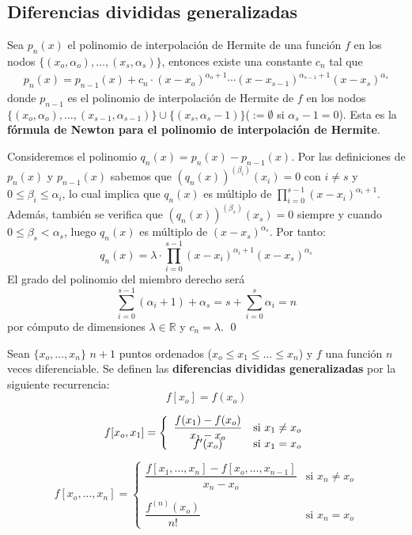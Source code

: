       \subsection{Diferencias divididas generalizadas}
      \begin{prop}
      Sea $p_n(x)$ el polinomio de interpolación de Hermite de una función $f$ en los nodos $\{(x_o,\alpha_o),\ldots,(x_s,\alpha_s)\}$, entonces existe una constante $c_n$ tal que
      \begin{align}
      p_n(x)=p_{n-1}(x)+c_n\cdot (x-x_o)^{\alpha_o+1}\cdots (x-x_{s-1})^{\alpha_{s-1}+1}(x-x_s)^{\alpha_s}
     \label{hermite:newton} \end{align}
      donde $p_{n-1}$ es el polinomio de interpolación de Hermite de $f$ en los nodos $\{(x_o,\alpha_o),\ldots,(x_{s-1},\alpha_{s-1})\}\cup \{(x_s,\alpha_s-1)\}$($:=\emptyset$ si $\alpha_s-1=0$). Esta es la \textbf{fórmula de Newton para el polinomio de interpolación de Hermite}.
      \end{prop}
      \begin{dem}
      Consideremos el polinomio $q_n(x)=p_n(x)-p_{n-1}(x)$. Por las definiciones de $p_n(x)$ y $p_{n-1}(x)$ sabemos que $(q_n(x))^{(\beta_i)}(x_i)=0$ con $i\neq s$ y $0\leq \beta_i\leq\alpha_i$, lo cual implica que $q_n(x)$ es múltiplo de $\prod_{i=0}^{s-1}(x-x_i)^{\alpha_i+1}$. Además, también se verifica que $(q_n(x))^{(\beta_s)}(x_s)=0$ siempre y cuando $0\leq \beta_s<\alpha_s$, luego $q_n(x)$ es múltiplo de $(x-x_s)^{\alpha_s}$. Por tanto:
      $$q_n(x)=\lambda\cdot \prod_{i=0}^{s-1}(x-x_i)^{\alpha_i+1}(x-x_s)^{\alpha_s}$$
      El grado del polinomio del miembro derecho será
      $$\sum_{i=0}^{s-1}(\alpha_i+1)+\alpha_s=s+\sum_{i=0}^{s}\alpha_i=n$$
      por cómputo de dimensiones $\lambda\in\mathbb{R}$ y $c_n=\lambda$.
      \qed\end{dem}
      \begin{defin}
    Sean $\{x_o,\ldots,x_n\}$ $n+1$ puntos ordenados ($x_o\leq x_1\leq \ldots\leq x_n$) y $f$ una función $n$ veces diferenciable. Se definen las \textbf{diferencias divididas generalizadas} por la siguiente recurrencia:
    $$f[x_o]=f(x_o)$$
    
    $$f[x_o,x_1]=\left\{\begin{array}{cc}
       \dfrac{f(x_1)-f(x_o)}{x_1-x_o}  &\text{si }x_1\neq x_o  \\
       \vspace{-5mm} & \\
         f'(x_o) & \text{si }x_1= x_o
    \end{array}\right.$$
    \begin{align}
    f[x_o,\ldots,x_n]=\left\{\begin{array}{cc}
       \dfrac{f[x_1,\ldots,x_n]-f[x_o,\ldots,x_{n-1}]}{x_n-x_o}  &\text{si }x_n\neq x_o  \\
       & \\
         \dfrac{f^{(n)}(x_o)}{n!} & \text{si }x_n= x_o
    \end{array}\right.
    \label{difdiv:gen}
    \end{align}
      \end{defin}
